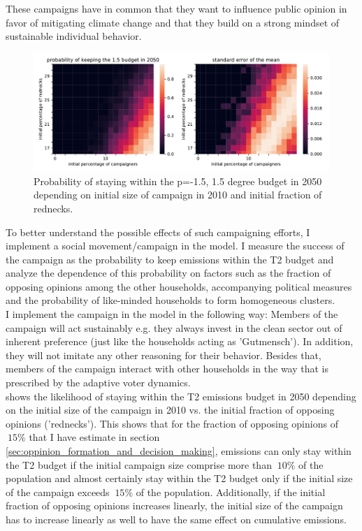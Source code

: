 These campaigns have in common that they want to influence public opinion in favor of mitigating climate change and that they build on a strong mindset of sustainable individual behavior.\\

\begin{figure}[t]
    \centering
\includegraphics[width = \textwidth]{figures/p_budget15p50_in2050.pdf}
\caption[Probability of staying within the p=0.5, 1,5 degree budget in 2050 depending on the initial size of a campaign in 2010]{Probability of staying within the p=-1.5, 1.5 degree budget in 2050 depending on initial size of campaign in 2010 and initial fraction of rednecks.}
    \label{fig:p15in2050}
\end{figure}

To better understand the possible effects of such campaigning efforts, I implement a social movement/campaign in the model. I measure the success of the campaign as the probability to keep emissions within the T2 budget and analyze the dependence of 
this probability on factors such as the fraction of opposing opinions among the other households, accompanying political measures and the probability of like-minded households to form homogeneous clusters.\\

I implement the campaign in the model in the following way: Members of the campaign will act sustainably e.g. they always invest in the clean sector out of inherent preference (just like the households acting as 'Gutmensch'). In addition, they will not imitate any other reasoning for their behavior. Besides that, members of the campaign interact with other households in the way that is prescribed by the adaptive voter dynamics.\\
 shows the likelihood of staying within the T2 emissions budget in 2050 depending on the initial size of the campaign in 2010 vs. the initial fraction of opposing opinions ('rednecks'). This shows that for the fraction of opposing opinions of $~15\%$ that I have estimate in section \ref{sec:oppinion_formation_and_decision_making}, emissions can only stay within the T2 budget if the initial campaign size comprise more than $~10\%$ of the population and almost certainly stay within the T2 budget only if the initial size of the campaign exceeds $~15\%$ of the population. Additionally, if the initial fraction of opposing opinions increases linearly, the initial size of the campaign has to increase linearly as well to have the same effect on cumulative emissions.\\

